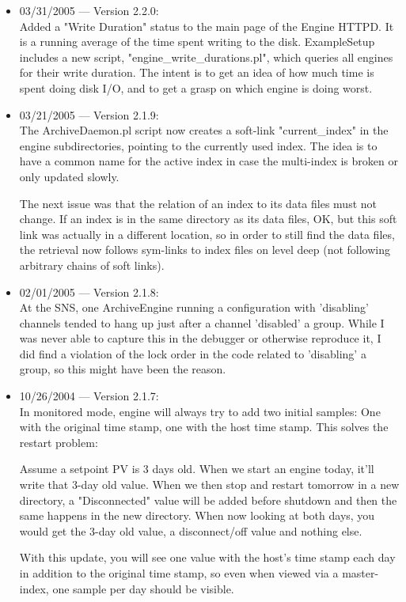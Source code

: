 \begin{itemize}
\item 03/31/2005 --- Version 2.2.0:\\
Added a "Write Duration" status to the main
page of the Engine HTTPD.
It is a running average of the time spent
writing to the disk.
ExampleSetup includes a new script,
"engine\_write\_durations.pl",
which queries all engines for their write duration.
The intent is to get an idea of how much time
is spent doing disk I/O, and to get a grasp on
which engine is doing worst.

\item 03/21/2005 --- Version 2.1.9:\\
The ArchiveDaemon.pl script now creates a soft-link
"current\_index" in the engine subdirectories,
pointing to the currently used index.
The idea is to have a common name for the active index
in case the multi-index is broken or only updated
slowly.

The next issue was that the relation of an index
to its data files must not change.
If an index is in the same directory as its data files,
OK, but this soft link was actually in a different location,
so in order to still find the data files, the retrieval
now follows sym-links to index files on level deep
(not following arbitrary chains of soft links).

\item 02/01/2005 --- Version 2.1.8:\\
At the SNS, one ArchiveEngine running a configuration with
'disabling' channels tended to hang up just after a channel
'disabled' a group.
While I was never able to capture this in the debugger or
otherwise reproduce it, I did find a violation of the lock
order in the code related to 'disabling' a group, so this
might have been the reason.

\item 10/26/2004 --- Version 2.1.7:\\
In monitored mode, engine will always try to add two initial
samples: One with the original time stamp, one with the host
time stamp. This solves the restart problem:

Assume a setpoint PV is 3 days old. When we start an engine today,
it'll write that 3-day old value. When we then stop and restart tomorrow
in a new directory, a "Disconnected" value will be added before shutdown
and then the same happens in the new directory.
When now looking at both days, you would get the 3-day old value,
a disconnect/off value and nothing else.

With this update, you will see one value with the host's time stamp
each day in addition to the original time stamp, so even when viewed
via a master-index, one sample per day should be visible.


\end{itemize}
